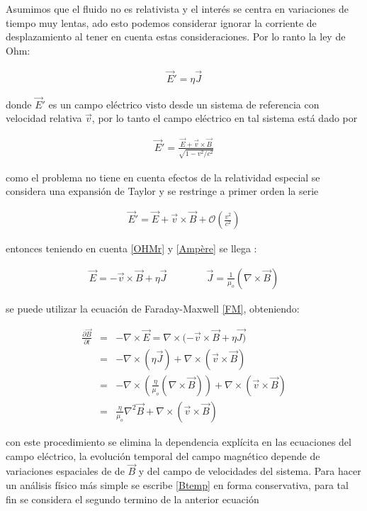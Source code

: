 Asumimos que el fluido no es relativista y el interés se centra en variaciones de tiempo muy lentas, ado esto podemos considerar ignorar la corriente de desplazamiento al tener en cuenta estas consideraciones. Por lo ranto la ley de Ohm\cite{Jackson}:

\begin{eqnarray}
\label{OHMr}
\vec{E}' = \eta\vec{J}
\end{eqnarray}

\noindent donde $\vec{E}'$ es un campo eléctrico visto desde un sistema de referencia con velocidad relativa $\vec{v}$, por lo tanto el campo eléctrico en tal sistema está dado por 

\begin{eqnarray}
\vec{E}' = \frac{\vec{E}+\vec{v}\times\vec{B}}{\sqrt{1-v^{2}/c^{2}}}
\end{eqnarray}

\noindent como el problema no tiene en cuenta efectos de la relatividad especial se considera una expansión de Taylor y se restringe a primer orden la serie

\begin{eqnarray}
\vec{E}' = \vec{E}+\vec{v}\times\vec{B} + \mathcal{O}\left(\frac{v^{2}}{c^{2}}\right)
\end{eqnarray}

\noindent entonces teniendo en cuenta \eqref{OHMr} y \eqref{Ampère} se llega :

\begin{eqnarray}
\vec{E} = -\vec{v}\times\vec{B}+\eta\vec{J} \qquad \qquad \vec{J} = \frac{1}{\mu_{o}}(\nabla \times \vec{B})
\end{eqnarray}

\noindent se puede utilizar la ecuación de Faraday-Maxwell \eqref{FM}, obteniendo:

\begin{eqnarray}
\label{Btemp}
\frac{\partial \vec{B}}{\partial t} &=& -\nabla \times \vec{E} = \nabla \times(-\vec{v}\times\vec{B}+\eta\vec{J)}\\
&=& -\nabla \times (\eta\vec{J})+\nabla\times(\vec{v}\times\vec{B})\\
&=&-\nabla\times\left(\frac{\eta}{\mu_{o}}(\nabla\times\vec{B})\right) + \nabla\times(\vec{v}\times\vec{B})\\
&=&\frac{\eta}{\mu_{o}}\nabla^{2}\vec{B} + \nabla\times(\vec{v}\times\vec{B})
\end{eqnarray}

\noindent con este procedimiento se elimina la dependencia explícita en las ecuaciones del campo eléctrico, la evolución temporal del campo magnético depende de variaciones espaciales de de $\vec{B}$ y del campo de velocidades del sistema. Para hacer un análisis físico más simple se escribe \eqref{Btemp} en forma conservativa, para tal fin se considera el segundo termino de la anterior ecuación

